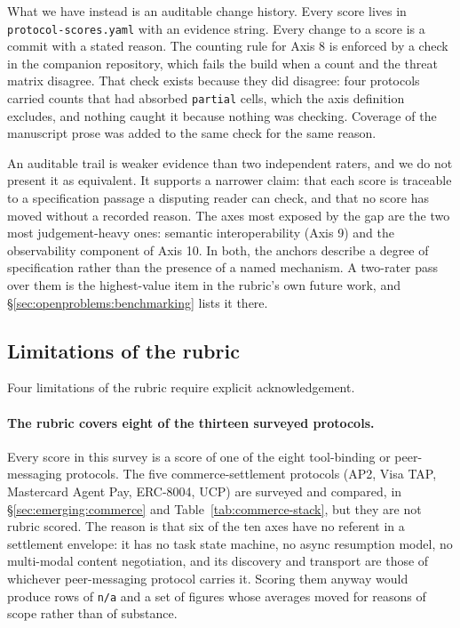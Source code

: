 What we have instead is an auditable change history. Every
score lives in \texttt{protocol-scores.yaml} with an
evidence string. Every change to a score is a commit with a
stated reason. The counting rule for Axis 8 is enforced by
a check in the companion repository, which fails the build
when a count and the threat matrix disagree. That check
exists because they did disagree: four protocols carried
counts that had absorbed \texttt{partial} cells, which the
axis definition excludes, and nothing caught it because
nothing was checking. Coverage of the manuscript prose was
added to the same check for the same reason.

An auditable trail is weaker evidence than two independent
raters, and we do not present it as equivalent. It supports
a narrower claim: that each score is traceable to a
specification passage a disputing reader can check, and
that no score has moved without a recorded reason. The
axes most exposed by the gap are the two most
judgement-heavy ones: semantic interoperability (Axis 9)
and the observability component of Axis 10. In both, the
anchors describe a degree of specification rather than the
presence of a named mechanism. A two-rater pass over them
is the highest-value item in the rubric's own future work,
and \S\ref{sec:openproblems:benchmarking} lists it there.

\subsection{Limitations of the rubric}
\label{sec:rubric:limits}

Four limitations of the rubric require explicit
acknowledgement.

\paragraph{The rubric covers eight of the thirteen surveyed
protocols.} Every score in this survey is a score of one of
the eight tool-binding or peer-messaging protocols. The five
commerce-settlement protocols (AP2, Visa TAP, Mastercard
Agent Pay, ERC-8004, UCP) are surveyed and compared, in
\S\ref{sec:emerging:commerce} and
Table~\ref{tab:commerce-stack}, but they are not rubric
scored. The reason is that six of the ten axes have no
referent in a settlement envelope: it has no task state
machine, no async resumption model, no multi-modal content
negotiation, and its discovery and transport are those of
whichever peer-messaging protocol carries it. Scoring them
anyway would produce rows of \texttt{n/a} and a set of
figures whose averages moved for reasons of scope rather
than of substance.


